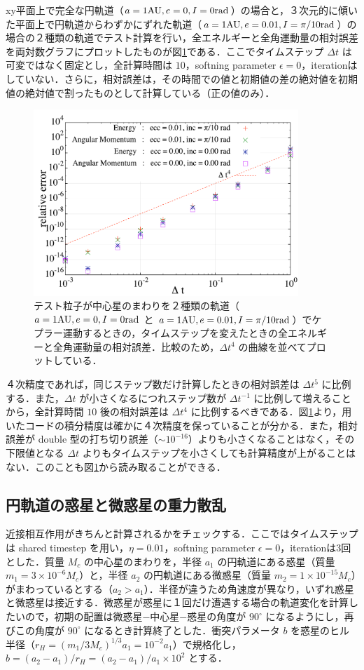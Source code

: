 \documentclass[11pt,a4paper,oneside,onecolumn]{jreport}
\begin{document}
xy平面上で完全な円軌道（$a = 1 {\rm AU}, e = 0, I = 0 {\rm rad}$）の場合と，３次元的に傾いた平面上で円軌道からわずかにずれた軌道（$a = 1 {\rm AU}, e = 0.01, I = \pi / 10 {\rm rad}$）の場合の２種類の軌道でテスト計算を行い，全エネルギーと全角運動量の相対誤差を両対数グラフにプロットしたものが図\ref{fig:relative_error}である．ここでタイムステップ $\Delta t$ は可変ではなく固定とし，全計算時間は $10$，softning parameter $\epsilon = 0$，iterationはしていない．さらに，相対誤差は，その時間での値と初期値の差の絶対値を初期値の絶対値で割ったものとして計算している（正の値のみ）．
\begin{figure}[H]
\centering
\includegraphics[width=10cm]{./image/relative_error.pdf}
\caption{テスト粒子が中心星のまわりを２種類の軌道（$a = 1 {\rm AU}, e = 0, I = 0 {\rm rad}$ と $a = 1 {\rm AU}, e = 0.01, I = \pi / 10 {\rm rad}$）でケプラー運動するときの，タイムステップを変えたときの全エネルギーと全角運動量の相対誤差．比較のため，$\Delta t^4$ の曲線を並べてプロットしている．\label{fig:relative_error}}
\end{figure}
４次精度であれば，同じステップ数だけ計算したときの相対誤差は $\Delta t^5$ に比例する．また，$\Delta t$ が小さくなるにつれステップ数が $\Delta t^{-1}$ に比例して増えることから，全計算時間 $10$ 後の相対誤差は $\Delta t^4$ に比例するべきである．図\ref{fig:relative_error}より，用いたコードの積分精度は確かに４次精度を保っていることが分かる．また，相対誤差が double 型の打ち切り誤差（$\sim 10^{-16}$）よりも小さくなることはなく，その下限値となる $\Delta t$ よりもタイムステップを小さくしても計算精度が上がることはない．このことも図\ref{fig:relative_error}から読み取ることができる．

\subsection{円軌道の惑星と微惑星の重力散乱}
近接相互作用がきちんと計算されるかをチェックする．ここではタイムステップは shared timestep を用い，$\eta = 0.01$，softning parameter $\epsilon = 0$，iterationは3回とした．質量 $M_c$ の中心星のまわりを，半径 $a_1$ の円軌道にある惑星（質量 $m_1 = 3 \times 10^{-6} M_c$）と，半径 $a_2$ の円軌道にある微惑星（質量 $m_2 = 1 \times 10^{-15} M_c$）がまわっているとする（$a_2 > a_1$）．半径が違うため角速度が異なり，いずれ惑星と微惑星は接近する．微惑星が惑星に１回だけ遭遇する場合の軌道変化を計算したいので，初期の配置は微惑星−中心星−惑星の角度が $90^{\circ}$ になるようにし，再びこの角度が $90^{\circ}$ になるとき計算終了とした．衝突パラメータ $b$ を惑星のヒル半径（$r_H = (m_1 / 3 M_c)^{1/3} a_1 = 10^{-2} a_1$）で規格化し，$b = (a_2 - a_1) / r_H = (a_2 - a_1) / a_1 \times 10^2$ とする．
\end{document}
